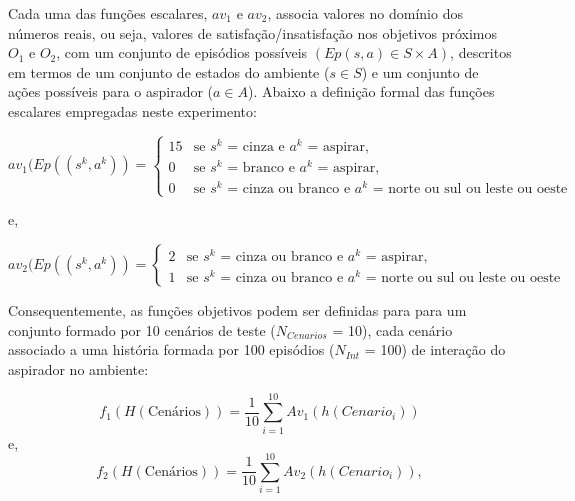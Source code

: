\begin{table}[h!]   
    \centering
\end{table}
    
Cada uma das funções escalares, $av_1$ e $av_2$, associa valores no domínio dos números reais, ou seja, valores de satisfação/insatisfação nos objetivos próximos $O_1$ e $O_2$, com um conjunto de episódios possíveis $(Ep(s,a) \in S\times A)$, descritos em termos de um conjunto de estados do ambiente ($s \in S$) e um conjunto de ações possíveis para o aspirador ($a \in A$). Abaixo a definição formal das funções escalares empregadas neste experimento:

\[
av_1(Ep((s^k, a^k)) =
\begin{cases}
  15 & \text{se $s^k$ = cinza e $a^k$ = aspirar,}\\
  0 & \text{se $s^k$ = branco e $a^k$ = aspirar,}\\
  0 & \text{se $s^k$ = cinza ou branco e $a^k$ = norte ou sul ou leste ou oeste}
\end{cases}
\]

e, 

\[
av_2(Ep((s^k, a^k)) =
\begin{cases}
  2 & \text{se $s^k$ = cinza ou branco e $a^k$ = aspirar,}\\
  1 & \text{se $s^k$ = cinza ou branco e $a^k$ = norte ou sul ou leste ou oeste}
\end{cases}
\]

Consequentemente, as funções objetivos podem ser definidas para para um conjunto formado por 10 cenários de teste ($N_{Cenarios}$ = 10), cada cenário associado a uma história formada por 100 episódios ($N_{Int}$ = 100) de interação do aspirador no ambiente:

\[
    f_1(H(\textrm{Cenários}))=\frac{1}{10}\sum_{i=1}^{10}Av_1(h(Cenario_i))
\]
e,
\[
    f_2(H(\textrm{Cenários}))=\frac{1}{10}\sum_{i=1}^{10}Av_2(h(Cenario_i)),
\]

